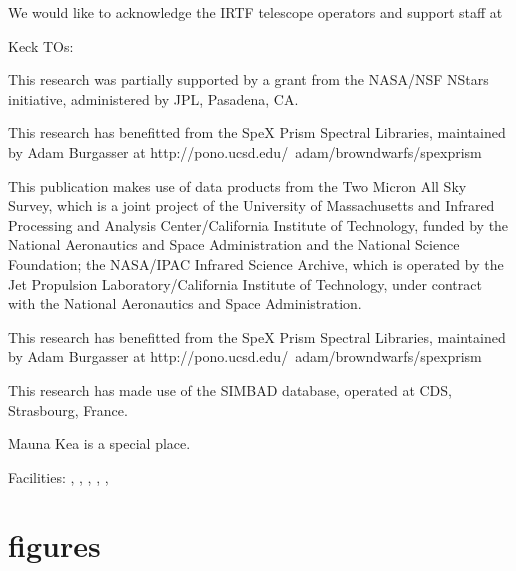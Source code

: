 \documentclass[12pt,preprint]{aastex}
\begin{document}
\acknowledgments
We would like to acknowledge the IRTF telescope operators
and support staff at 

Keck TOs:

This research was partially supported by a grant from the NASA/NSF NStars initiative, administered by JPL, Pasadena, CA.  

This research has benefitted from the SpeX Prism Spectral Libraries, maintained by Adam Burgasser at http://pono.ucsd.edu/~adam/browndwarfs/spexprism

This publication makes use of data products from the Two Micron All Sky Survey, which is a joint project of the University of Massachusetts and Infrared Processing and Analysis Center/California Institute of Technology, funded by the National Aeronautics and Space Administration and the National Science Foundation; the NASA/IPAC Infrared Science Archive, which is operated by the Jet Propulsion Laboratory/California Institute of Technology, under contract with the National Aeronautics and Space Administration.  

This research has benefitted from the SpeX Prism Spectral Libraries, maintained by Adam Burgasser at http://pono.ucsd.edu/~adam/browndwarfs/spexprism

This research has made use of the SIMBAD database, operated at CDS, Strasbourg, France.

Mauna Kea is a special place.

Facilities: 
, 
,
, 
,
, 
                                     

%


\clearpage 
\section{figures}
\end{document}

